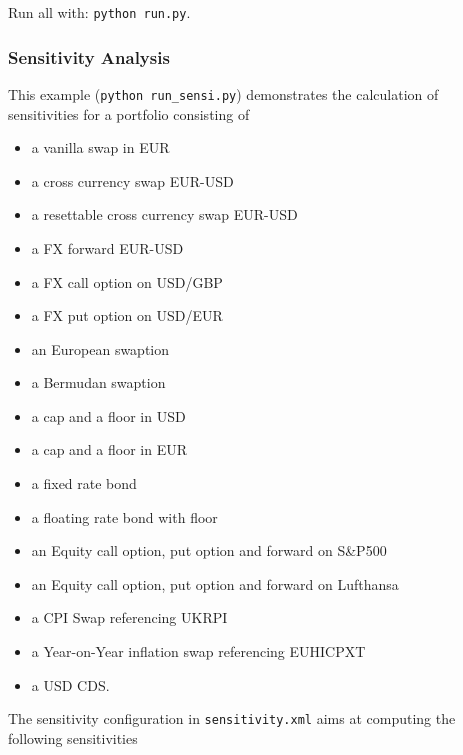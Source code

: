Run all with: {\tt python run.py}.

\subsubsection{Sensitivity Analysis}
\label{example:marketrisk_sensi}

This example ({\tt python run\_sensi.py}) demonstrates the calculation of sensitivities for a portfolio consisting of
\begin{itemize}
\item a vanilla swap in EUR
\item a cross currency swap EUR-USD
\item a resettable cross currency swap EUR-USD
\item a FX forward EUR-USD
\item a FX call option on USD/GBP %
\item a FX put option on USD/EUR
\item an European swaption
\item a Bermudan swaption
\item a cap and a floor in USD
\item a cap and a floor in EUR
\item a fixed rate bond
\item a floating rate bond with floor
\item an Equity call option, put option and forward on S\&P500
\item an Equity call option, put option and forward on Lufthansa
\item a CPI Swap referencing UKRPI
\item a Year-on-Year inflation swap referencing EUHICPXT
\item a USD CDS.
\end{itemize}

The sensitivity configuration in {\tt sensitivity.xml} aims at computing the following sensitivities

